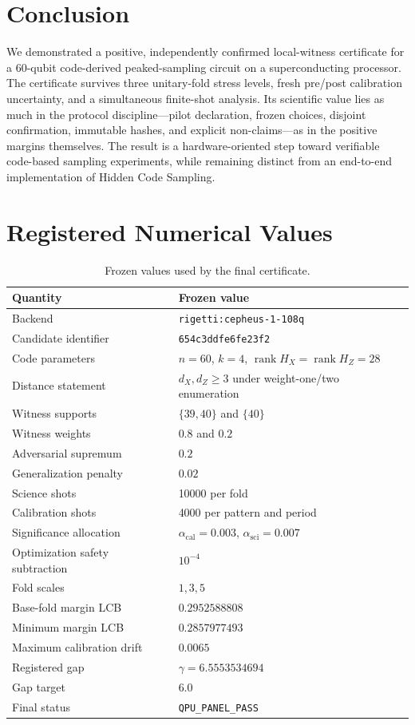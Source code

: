 \documentclass[11pt]{article}
\begin{document}
\section{Conclusion}
We demonstrated a positive, independently confirmed local-witness certificate for a 60-qubit code-derived peaked-sampling circuit on a superconducting processor. The certificate survives three unitary-fold stress levels, fresh pre/post calibration uncertainty, and a simultaneous finite-shot analysis. Its scientific value lies as much in the protocol discipline---pilot declaration, frozen choices, disjoint confirmation, immutable hashes, and explicit non-claims---as in the positive margins themselves. The result is a hardware-oriented step toward verifiable code-based sampling experiments, while remaining distinct from an end-to-end implementation of Hidden Code Sampling.

\appendix
\section{Registered Numerical Values}
\begin{table}[H]
\centering
\caption{Frozen values used by the final certificate.}
\begin{tabular}{@{}ll@{}}
\toprule
Quantity & Frozen value \\
\midrule
Backend & \texttt{rigetti:cepheus-1-108q} \\
Candidate identifier & \texttt{654c3ddfe6fe23f2} \\
Code parameters & $n=60$, $k=4$, $\operatorname{rank}H_X=\operatorname{rank}H_Z=28$ \\
Distance statement & $d_X,d_Z\geq3$ under weight-one/two enumeration \\
Witness supports & $\{39,40\}$ and $\{40\}$ \\
Witness weights & $0.8$ and $0.2$ \\
Adversarial supremum & $0.2$ \\
Generalization penalty & $0.02$ \\
Science shots & \num{10000} per fold \\
Calibration shots & \num{4000} per pattern and period \\
Significance allocation & $\alpha_{\mathrm{cal}}=0.003$, $\alpha_{\mathrm{sci}}=0.007$ \\
Optimization safety subtraction & $10^{-4}$ \\
Fold scales & $1,3,5$ \\
Base-fold margin LCB & $0.2952588808$ \\
Minimum margin LCB & $0.2857977493$ \\
Maximum calibration drift & $0.0065$ \\
Registered gap & $\gamma=6.5553534694$ \\
Gap target & $6.0$ \\
Final status & \texttt{QPU\_PANEL\_PASS} \\
\bottomrule
\end{tabular}
\end{table}
\end{document}
